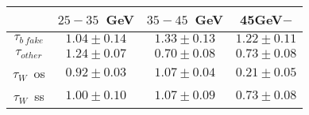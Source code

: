 \centering
\begin{tabular}{|c|c|c|c|} \hline
 & $25-35$~GeV & $35-45$~GeV & 45GeV$-$\\\hline
$\tau_{b~fake}$ & $1.04\pm0.14$ & $1.33\pm0.13$ & $1.22\pm0.11$\\\hline
$\tau_{other}$ & $1.24\pm0.07$ & $0.70\pm0.08$ & $0.73\pm0.08$\\\hline
$\tau_{W}$~os & $0.92\pm0.03$ & $1.07\pm0.04$ & $0.21\pm0.05$\\\hline
$\tau_{W}$~ss & $1.00\pm0.10$ & $1.07\pm0.09$ & $0.73\pm0.08$\\\hline
\end{tabular}
